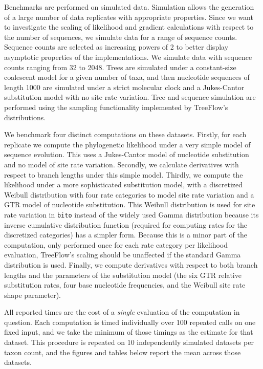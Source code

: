 \documentclass[oupdraft]{sysbio_sse}
\begin{document}
Benchmarks are performed on simulated data. Simulation allows the generation of a large number of data replicates with appropriate properties. Since we want to investigate the scaling of likelihood and gradient calculations with respect to the number of sequences, we simulate data for a range of sequence counts. Sequence counts are selected as increasing powers of 2 to better display asymptotic properties of the implementations. We simulate data with sequence counts ranging from 32 to 2048. Trees are simulated under a constant-size coalescent model for a given number of taxa, and then nucleotide sequences of length 1000 are simulated under a strict molecular clock and a Jukes-Cantor substitution model with no site rate variation. Tree and sequence simulation are performed using the sampling functionality implemented by TreeFlow's distributions.

We benchmark four distinct computations on these datasets. Firstly, for each replicate we compute the phylogenetic likelihood under a very simple model of sequence evolution. This uses a Jukes-Cantor model of nucleotide substitution and no model of site rate variation. Secondly, we calculate derivatives with respect to branch lengths under this simple model. Thirdly, we compute the likelihood under a more sophisticated substitution model, with a discretized Weibull distribution with four rate categories to model site rate variation and a GTR model of nucleotide substitution. This Weibull distribution is used for site rate variation in \texttt{bito} instead of the widely used Gamma distribution because its inverse cumulative distribution function (required for computing rates for the discretized categories) has a simpler form. Because this is a minor part of the computation, only performed once for each rate category per likelihood evaluation, TreeFlow's scaling should be unaffected if the standard Gamma distribution is used. Finally, we compute derivatives with respect to both branch lengths and the parameters of the substitution model (the six GTR relative substitution rates, four base nucleotide frequencies, and the Weibull site rate shape parameter).

All reported times are the cost of a \textit{single} evaluation of the computation in question. Each computation is timed individually over 100 repeated calls on one fixed input, and we take the minimum of those timings as the estimate for that dataset. This procedure is repeated on 10 independently simulated datasets per taxon count, and the figures and tables below report the mean across those datasets.
\end{document}
